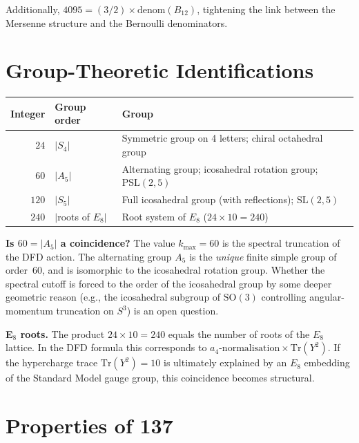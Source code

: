 \documentclass[11pt]{article}
\begin{document}
Additionally, $4095 = (3/2)\times\mathrm{denom}(B_{12})$, tightening the link
between the Mersenne structure and the Bernoulli denominators.

\section{Group-Theoretic Identifications}
\label{sec:groups}

\begin{center}
\renewcommand{\arraystretch}{1.3}
\begin{tabular}{r@{\;=\;}ll}
\toprule
\textbf{Integer} & \textbf{Group order} & \textbf{Group} \\
\midrule
$24$  & $|S_4|$     & Symmetric group on 4 letters; chiral octahedral group \\
$60$  & $|A_5|$     & Alternating group; icosahedral rotation group; $\mathrm{PSL}(2,5)$ \\
$120$ & $|S_5|$     & Full icosahedral group (with reflections); $\mathrm{SL}(2,5)$ \\
$240$ & $|$roots of $E_8|$ & Root system of $E_8$ ($24\times 10 = 240$) \\
\bottomrule
\end{tabular}
\end{center}

\medskip\noindent
\textbf{Is $60 = |A_5|$ a coincidence?}  The value $k_{\max}=60$ is the spectral
truncation of the DFD action.  The alternating group $A_5$ is the \emph{unique}
finite simple group of order~60, and is isomorphic to the icosahedral rotation
group.  Whether the spectral cutoff is forced to the order of the icosahedral
group by some deeper geometric reason (e.g., the icosahedral subgroup of $\mathrm{SO}(3)$
controlling angular-momentum truncation on $S^3$) is an open question.

\textbf{E${}_8$ roots.}  The product $24\times 10 = 240$ equals the number of
roots of the $E_8$ lattice.  In the DFD formula this corresponds to
$a_4\text{-normalisation}\times\mathrm{Tr}(Y^2)$. If the hypercharge trace
$\mathrm{Tr}(Y^2)=10$ is ultimately explained by an $E_8$ embedding of the
Standard Model gauge group, this coincidence becomes structural.

\section{Properties of 137}
\label{sec:137}
\end{document}
